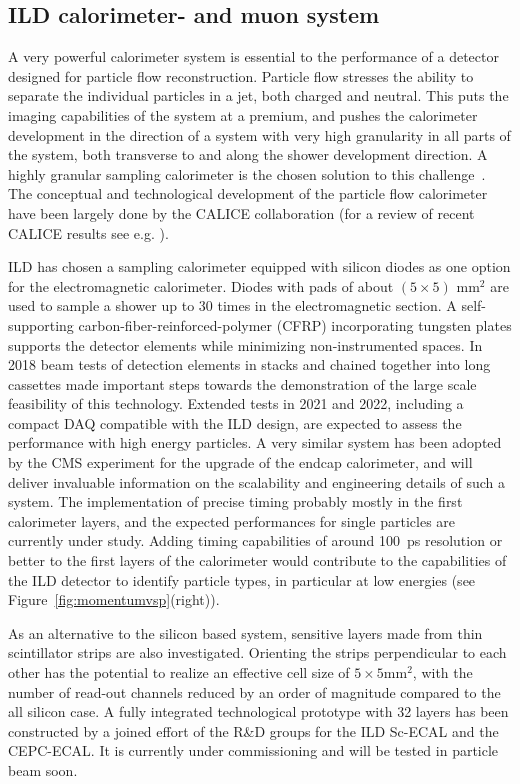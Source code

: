 \subsection{ILD calorimeter- and muon  system}
\label{sec:ILD-forward}
A very powerful calorimeter system is essential to the performance of a detector designed for particle flow reconstruction. Particle flow stresses the ability to separate the individual particles in a jet, both charged and neutral. This puts the imaging capabilities of the system at a premium, and pushes the calorimeter development in the direction of a system with very high granularity in all parts of the system, both transverse to and along the shower development direction. A highly granular sampling calorimeter is the chosen solution to this challenge~\cite{Sefkow:2015hna}. The conceptual and technological development of the particle flow calorimeter have been largely done by the CALICE collaboration (for a review of recent CALICE results see {e.g.} \cite{Grenier:2017ewg,Ootani:2021qna}). 

ILD has chosen a sampling calorimeter {equipped} with silicon diodes as one option for the electromagnetic calorimeter. Diodes with pads of about $(5 \times 5)$ mm$^2$ are used to sample a shower up to 30 times in the electromagnetic section.  {A self-supporting carbon-fiber-reinforced-polymer (CFRP) incorporating tungsten plates supports the detector elements while minimizing non-instrumented spaces}. In 2018 {beam tests of detection elements in stacks and chained together into long cassettes made important steps towards the demonstration of the large scale feasibility of this technology.
Extended tests in 2021 and 2022, including a compact DAQ compatible with the ILD design, are expected to assess the performance with high energy particles.} A very similar system has been adopted by the CMS experiment for the upgrade of the endcap calorimeter, and will deliver invaluable information on the scalability and engineering details of such a system.
 The implementation of precise timing probably mostly in the first calorimeter layers, and the expected performances for single particles are currently under study. Adding timing capabilities of around 100~ps resolution or better to the first layers of the calorimeter would contribute to the capabilities of the ILD detector to identify particle types, in particular at low energies (see Figure~\ref{fig:momentumvsp}(right)).

As an alternative to the silicon based system, sensitive layers made from thin scintillator strips are also investigated. Orienting the strips perpendicular to each other has the potential to realize an effective cell size of $5\times 5$mm$^2$, with the number of read-out channels reduced by an order of magnitude compared to the all silicon case.  A fully integrated technological prototype with 32 layers has been constructed by a joined effort of the R\&D groups for the ILD Sc-ECAL and the CEPC-ECAL. It is currently under commissioning and will be tested in particle beam soon.

